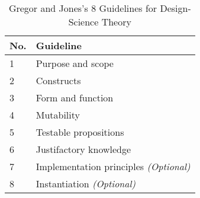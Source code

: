 \begin{table}[ht]
  \begin{center}
    \caption{Gregor and Jones's 8 Guidelines for Design-Science Theory}
    \label{tab:GregorGuidelines}
    \begin{tabular}{|l|l|} %
      \hline
      \textbf{No.} & \textbf{Guideline}                            \\
      \hline
      1            & Purpose and scope                             \\
      \hline
      2            & Constructs                                    \\
      \hline
      3            & Form and function                             \\
      \hline
      4            & Mutability                                    \\
      \hline
      5            & Testable propositions                         \\
      \hline
      6            & Justifactory knowledge                        \\
      \hline
      7            & Implementation principles \textit{(Optional)} \\
      \hline
      8            & Instantiation \textit{(Optional)}             \\
      \hline
    \end{tabular}
  \end{center}
\end{table}